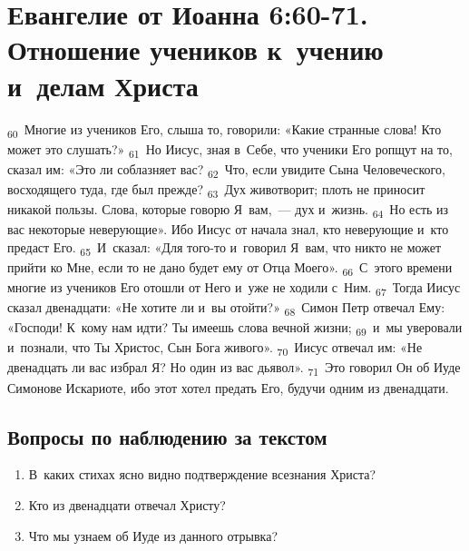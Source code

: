 \documentclass[a4paper,12pt]{article}
\begin{document}

\section{Евангелие от Иоанна 6:60-71. Отношение учеников к~учению и~делам Христа}

 \textsubscript{60}~Многие из учеников Его, слыша то, говорили: «Какие странные слова! Кто может это слушать?» \textsubscript{61}~Но Иисус, зная в~Себе, что ученики Его ропщут на то, сказал им: «Это ли соблазняет вас? \textsubscript{62}~Что, если увидите Сына Человеческого, восходящего туда, где был прежде? \textsubscript{63}~Дух животворит; плоть не приносит никакой пользы. Слова, которые говорю Я~вам,~--- дух и~жизнь. \textsubscript{64}~Но есть из вас некоторые неверующие». Ибо Иисус от начала знал, кто неверующие и~кто предаст Его. \textsubscript{65}~И~сказал: «Для того-то и~говорил Я~вам, что никто не может прийти ко Мне, если то не дано будет ему от Отца Моего». \textsubscript{66}~С~этого времени многие из учеников Его отошли от Него и~уже не ходили с~Ним. \textsubscript{67}~Тогда Иисус сказал двенадцати: «Не хотите ли и~вы отойти?» \textsubscript{68}~Симон Петр отвечал Ему: «Господи! К~кому нам идти? Ты имеешь слова вечной жизни; \textsubscript{69}~и~мы уверовали и~познали, что Ты Христос, Сын Бога живого». \textsubscript{70}~Иисус отвечал им: «Не двенадцать ли вас избрал Я? Но один из вас дьявол». \textsubscript{71}~Это говорил Он об Иуде Симонове Искариоте, ибо этот хотел предать Его, будучи одним из двенадцати. 

\subsection*{Вопросы по наблюдению за текстом}
\begin{enumerate}
    \item В~каких стихах ясно видно подтверждение всезнания Христа? 
    
    \myline
    
    \item Кто из двенадцати отвечал Христу? 
    
    \myline
    
    \item Что мы узнаем об Иуде из данного отрывка? 
    
    \myline
    
    \myline
\end{enumerate}
\end{document}
